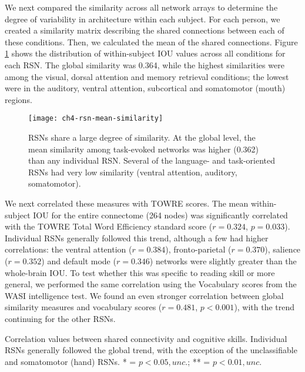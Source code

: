 We next compared the similarity across all network arrays to determine the degree of variability in architecture within each subject. For each person, we created a similarity matrix describing the shared connections between each of these conditions. Then, we calculated the mean of the shared connections. Figure \ref{fig:ch4-rsn-mean-similarity} shows the distribution of within-subject IOU values across all conditions for each RSN. The global similarity was 0.364, while the highest similarities were among the visual, dorsal attention and memory retrieval conditions; the lowest were in the auditory, ventral attention, subcortical and somatomotor (mouth) regions.

\begin{figure}[t!]
	\centering
	\texttt{[image: ch4-rsn-mean-similarity]}
    \caption[RSNs share a large degree of similarity]{RSNs share a large degree of similarity. At the global level, the mean similarity among task-evoked networks was higher (0.362) than any individual RSN. Several of the language- and task-oriented RSNs had very low similarity (ventral attention, auditory, somatomotor).}
	\label{fig:ch4-rsn-mean-similarity}
\end{figure}

We next correlated these measures with TOWRE scores. The mean within-subject IOU for the entire connectome (264 nodes) was significantly correlated with the TOWRE Total Word Efficiency standard score ($r = 0.324$, $p = 0.033$). Individual RSNs generally followed this trend, although a few had higher correlations: the ventral attention ($r=0.384$), fronto-parietal ($r=0.370$), salience ($r=0.352$) and default mode ($r=0.346$) networks were slightly greater than the whole-brain IOU. To test whether this was specific to reading skill or more general, we performed the same correlation using the Vocabulary scores from the WASI intelligence test. We found an even stronger correlation between global similarity measures and vocabulary scores ($r = 0.481$, $p < 0.001$), with the trend continuing for the other RSNs. 

\begin{table}[t!]
	\renewcommand{\tabcolsep}{0.09cm}
	\centering
	
	\caption[Correlation values between shared connectivity and cognitive skill]{Correlation values between shared connectivity and cognitive skills. Individual RSNs generally followed the global trend, with the exception of the unclassifiable and somatomotor (hand) RSNs. * = $p < 0.05, unc.$; ** = $p < 0.01, unc.$}
	\label{table:ch4-rsn-similarity-to-reading}
\end{table}

